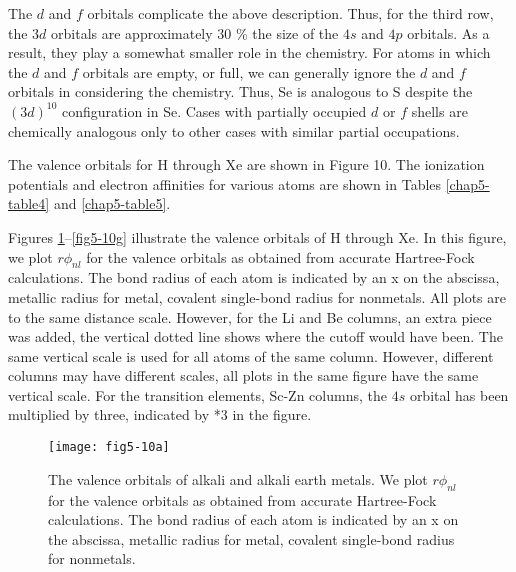 The $d$ and $f$ orbitals complicate the above description. Thus, for
the third row, the $3d$ orbitals are approximately 30 \% the size
of the $4s$ and $4p$ orbitals.  As a result, they play a somewhat
smaller role in the chemistry.  For atoms in which the $d$ and $f$
orbitals are empty, or full, we can generally ignore the $d$ and $f$
orbitals in considering the chemistry.  Thus, Se is analogous to S
despite the $(3d)^{10}$ configuration in Se.  Cases with partially
occupied $d$ or $f$ shells are chemically analogous only to other
cases with similar partial occupations.

The valence orbitals for H through Xe are shown in Figure 10.  The ionization
potentials and electron affinities for various atoms are shown in
Tables \ref{chap5-table4} and \ref{chap5-table5}.

\begin{table}
\caption{}
\label{chap5-table4}
\end{table}

\begin{table}
\caption{}
\label{chap5-table5}
\end{table}

Figures \ref{fig5-10a}--\ref{fig5-10g} illustrate the valence orbitals
of H through Xe. In this figure, we plot $r \phi_{nl}$ for the valence
orbitals as obtained from accurate Hartree-Fock calculations. The
bond radius of each atom is indicated by an x on the abscissa,
metallic radius for metal, covalent single-bond radius for nonmetals.
All plots are to the same distance scale.  However, for the Li and Be
columns, an extra piece was added, the vertical dotted line shows
where the cutoff would have been. The same vertical scale is used for
all atoms of the same column. However, different columns may have
different scales, all plots in the same figure have the same vertical
scale.  For the transition elements, Sc-Zn columns, the $4s$ orbital
has been multiplied by three, indicated by *3 in the figure.

\begin{figure}
\texttt{[image: fig5-10a]}
\caption{The valence orbitals of alkali and alkali earth metals. We
plot $r \phi_{nl}$ for the valence orbitals as obtained from accurate
Hartree-Fock calculations. The bond radius of each atom is indicated
by an x on the abscissa, metallic radius for metal, covalent
single-bond radius for nonmetals.}
\label{fig5-10a}
\end{figure}

